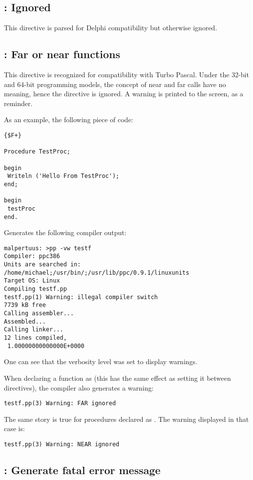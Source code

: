\subsection{: Ignored}
This directive is parsed for Delphi compatibility but otherwise ignored. 

\subsection{ : Far or near functions}
This directive is recognized for compatibility with Turbo Pascal. Under the
32-bit and 64-bit programming models, the concept of near and far calls have
no meaning, hence the directive is ignored. A warning is printed to the screen, 
as a reminder.

As an example, the following piece of code:
\begin{verbatim}
{$F+}

Procedure TestProc;

begin
 Writeln ('Hello From TestProc');
end;

begin
 testProc
end.
\end{verbatim}
Generates the following compiler output:
\begin{verbatim}
malpertuus: >pp -vw testf
Compiler: ppc386
Units are searched in: /home/michael;/usr/bin/;/usr/lib/ppc/0.9.1/linuxunits
Target OS: Linux
Compiling testf.pp
testf.pp(1) Warning: illegal compiler switch
7739 kB free
Calling assembler...
Assembled...
Calling linker...
12 lines compiled,
 1.00000000000000E+0000
\end{verbatim}
One can see that the verbosity level was set to display warnings.

When declaring a function as  (this has the same effect as setting it
between  directives), the compiler also generates a
warning:
\begin{verbatim}
testf.pp(3) Warning: FAR ignored
\end{verbatim}

The same story is true for procedures declared as . The warning
displayed in that case is:
\begin{verbatim}
testf.pp(3) Warning: NEAR ignored
\end{verbatim}

\subsection{ : Generate fatal error message}


